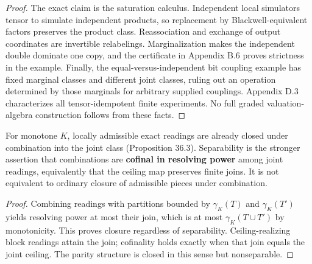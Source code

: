 \begin{proof}

The exact claim is the saturation calculus. Independent local simulators tensor to simulate independent products, so replacement by Blackwell-equivalent factors preserves the product class. Reassociation and exchange of output coordinates are invertible relabelings. Marginalization makes the independent double dominate one copy, and the certificate in Appendix B.6 proves strictness in the example. Finally, the equal-versus-independent bit coupling example has fixed marginal classes and different joint classes, ruling out an operation determined by those marginals for arbitrary supplied couplings. Appendix D.3 characterizes all tensor-idempotent finite experiments. No full graded valuation-algebra construction follows from these facts.
\end{proof}

\begin{thmplain}

For monotone \(K\), locally admissible exact readings are already closed under combination into the joint class (Proposition 36.3). Separability is the stronger assertion that combinations are \textbf{cofinal in resolving power} among joint readings, equivalently that the ceiling map preserves finite joins. It is not equivalent to ordinary closure of admissible pieces under combination.
\end{thmplain}

\begin{proof}

Combining readings with partitions bounded by \(\gamma_K(T)\) and \(\gamma_K(T')\) yields resolving power at most their join, which is at most \(\gamma_K(T\cup T')\) by monotonicity. This proves closure regardless of separability. Ceiling-realizing block readings attain the join; cofinality holds exactly when that join equals the joint ceiling. The parity structure is closed in this sense but nonseparable.
\end{proof}


